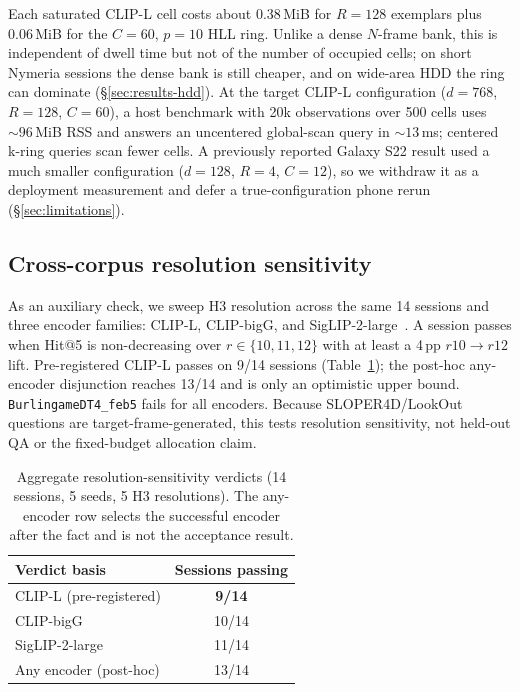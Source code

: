 Each saturated CLIP-L cell costs about 0.38\,MiB for $R{=}128$ exemplars plus
0.06\,MiB for the $C{=}60$, $p{=}10$ HLL ring. Unlike a dense $N$-frame bank,
this is independent of dwell time but not of the number of occupied cells; on
short Nymeria sessions the dense bank is still cheaper, and on wide-area HDD the
ring can dominate (\S\ref{sec:results-hdd}). At the target CLIP-L
configuration ($d{=}768$, $R{=}128$, $C{=}60$), a host benchmark with 20k
observations over 500 cells uses ${\sim}96$\,MiB RSS and answers an uncentered
global-scan query in ${\sim}13$\,ms; centered k-ring queries scan fewer cells. A
previously reported Galaxy S22 result used a much smaller configuration
($d{=}128$, $R{=}4$, $C{=}12$), so we withdraw it as a deployment measurement
and defer a true-configuration phone rerun (\S\ref{sec:limitations}).

\subsection{Cross-corpus resolution sensitivity}
\label{sec:results-multi-corpus}

As an auxiliary check, we sweep H3 resolution across the same 14 sessions and
three encoder families: CLIP-L, CLIP-bigG, and
SigLIP-2-large~\cite{tschannen2025siglip2}. A session passes when Hit@5 is non-decreasing over
$r\in\{10,11,12\}$ with at least a 4\,pp $r10{\to}r12$ lift. Pre-registered
CLIP-L passes on 9/14 sessions (Table~\ref{tab:multi-corpus-h3}); the post-hoc
any-encoder disjunction reaches 13/14 and is only an optimistic upper bound.
\texttt{BurlingameDT4\_feb5} fails for all encoders. Because SLOPER4D/LookOut
questions are target-frame-generated, this tests resolution sensitivity, not
held-out QA or the fixed-budget allocation claim.

\begin{table}[h]
\centering
\begin{tabular}{lc}
\toprule
Verdict basis & Sessions passing \\
\midrule
CLIP-L (pre-registered) & \textbf{9/14} \\
CLIP-bigG & 10/14 \\
SigLIP-2-large & 11/14 \\
Any encoder (post-hoc) & 13/14 \\
\bottomrule
\end{tabular}
\caption{Aggregate resolution-sensitivity verdicts (14 sessions, 5 seeds,
5 H3 resolutions). The any-encoder row selects the successful encoder after the
fact and is not the acceptance result.}
\label{tab:multi-corpus-h3}
\end{table}

